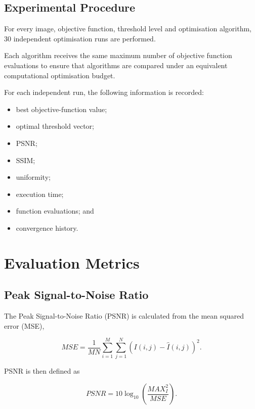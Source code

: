 \documentclass[review]{elsarticle}
\begin{document}
\subsection{Experimental Procedure}

For every image, objective function, threshold level and optimisation
algorithm, 30 independent optimisation runs are performed.

Each algorithm receives the same maximum number of objective function
evaluations to ensure that algorithms are compared under an equivalent
computational optimisation budget.

For each independent run, the following information is recorded:

\begin{itemize}
    \item best objective-function value;
    \item optimal threshold vector;
    \item PSNR;
    \item SSIM;
    \item uniformity;
    \item execution time;
    \item function evaluations; and
    \item convergence history.
\end{itemize}



\section{Evaluation Metrics}
\label{sec:metrics}


\subsection{Peak Signal-to-Noise Ratio}

The Peak Signal-to-Noise Ratio (PSNR) is calculated from the mean
squared error (MSE),

\begin{equation}
MSE =
\frac{1}{MN}
\sum_{i=1}^{M}
\sum_{j=1}^{N}
\left(
I(i,j)-\hat{I}(i,j)
\right)^2.
\end{equation}

PSNR is then defined as

\begin{equation}
PSNR =
10\log_{10}
\left(
\frac{MAX_I^2}{MSE}
\right).
\end{equation}
\end{document}
